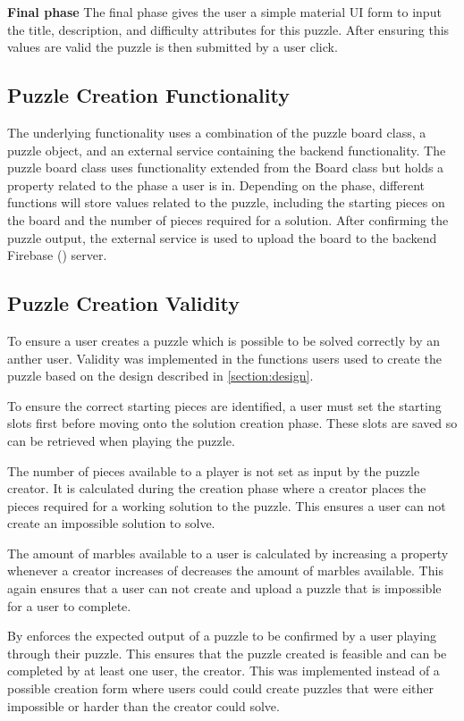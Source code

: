\documentclass{l4proj}
\begin{document}
\textbf{Final phase}
The final phase gives the user a simple material UI form to input the title, description, and difficulty attributes for this puzzle. After ensuring this values are valid the puzzle is then submitted by a user click.

\subsection{Puzzle Creation Functionality}
The underlying functionality uses a combination of the puzzle board class, a puzzle object, and an external service containing the backend functionality. The puzzle board class uses functionality extended from the Board class but holds a property related to the phase a user is in. Depending on the phase, different functions will store values related to the puzzle, including the starting pieces on the board and the number of pieces required for a solution. After confirming the puzzle output, the external service is used to upload the board to the backend Firebase (\cite{firebase}) server.

\subsection{Puzzle Creation Validity}
To ensure a user creates a puzzle which is possible to be solved correctly by an anther user. Validity was implemented in the functions users used to create the puzzle based on the design described in \ref{section:design}.

To ensure the correct starting pieces are identified, a user must set the starting slots first before moving onto the solution creation phase. These slots are saved so can be retrieved when playing the puzzle.

The number of pieces available to a player is not set as input by the puzzle creator. It is calculated during the creation phase where a creator places the pieces required for a working solution to the puzzle. This ensures a user can not create an impossible solution to solve.

The amount of marbles available to a user is calculated by increasing a property whenever a creator increases of decreases the amount of marbles available. This again ensures that a user can not create and upload a puzzle that is impossible for a user to complete. 

By enforces the expected output of a puzzle to be confirmed by a user playing through their puzzle. This ensures that the puzzle created is feasible and can be completed by at least one user, the creator. This was implemented instead of a possible creation form where users could could create puzzles that were either impossible or harder than the creator could solve.
\end{document}
